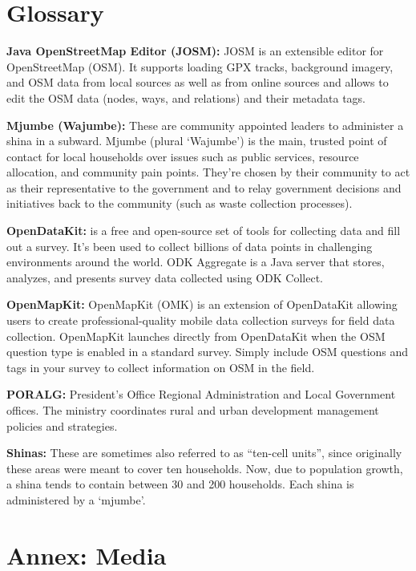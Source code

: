 \documentclass[a4paper,12pt,twoside]{article}
\begin{document}
\section{Glossary}
\begin{multicols}{2}

\textbf{Java OpenStreetMap Editor (JOSM):} JOSM is an extensible editor for ​OpenStreetMap (OSM). It supports loading GPX tracks, background imagery, and OSM data from local sources as well as from online sources and allows to edit the OSM data (nodes, ways, and relations) and their metadata tags.


\textbf{Mjumbe (Wajumbe):} These are community appointed leaders to administer a shina in a subward. Mjumbe (plural ‘Wajumbe’) is the main, trusted point of contact for local households over issues such as public services, resource allocation, and community pain points. They’re chosen by their community to act as their representative to the government and to relay government decisions and initiatives back to the community (such as waste collection processes).


\textbf {OpenDataKit:} is a free and open-source set of tools for collecting data and fill out a  survey. It's been used to collect billions of data points in challenging environments around the world. ODK Aggregate is a Java server that stores, analyzes, and presents survey data collected using ODK Collect.


\textbf{OpenMapKit:} OpenMapKit (OMK) is an extension of OpenDataKit allowing users to create professional-quality mobile data collection surveys for field data collection. OpenMapKit launches directly from OpenDataKit when the OSM question type is enabled in a standard survey. Simply include OSM questions and tags in your survey to collect information on OSM in the field.


\textbf{PORALG:} President's Office Regional Administration and Local Government offices. The ministry coordinates rural and urban development management policies and strategies.


\textbf{Shinas:} These are sometimes also referred to as “ten-cell units”, since originally these areas were meant to cover ten households. Now, due to population growth, a shina tends to contain between 30 and 200 households. Each shina is administered by a ‘mjumbe’.
\end{multicols}

\newpage
\section{Annex: Media}
\end{document}

